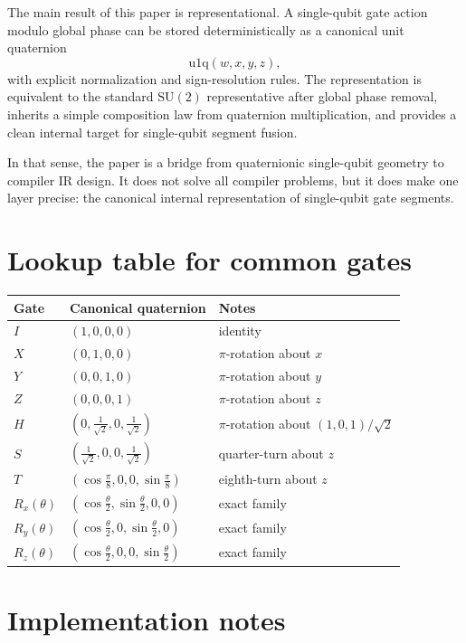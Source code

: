 \documentclass[11pt]{article}
\theoremstyle{remark}
\newcommand{\SU}{\mathrm{SU}}
\newcommand{\Id}{I}
\newcommand{\uoneq}{\mathrm{u1q}}
\begin{document}
The main result of this paper is representational. A single-qubit gate action
modulo global phase can be stored deterministically as a canonical unit
quaternion
\[
\uoneq(w,x,y,z),
\]
with explicit normalization and sign-resolution rules. The representation is
equivalent to the standard $\SU(2)$ representative after global phase removal,
inherits a simple composition law from quaternion multiplication, and provides a
clean internal target for single-qubit segment fusion.

In that sense, the paper is a bridge from quaternionic single-qubit geometry to
compiler IR design. It does not solve all compiler problems, but it does make
one layer precise: the canonical internal representation of single-qubit gate
segments.

\appendix

\section{Lookup table for common gates}

\begin{center}
\begin{tabular}{@{}lll@{}}
\toprule
Gate & Canonical quaternion & Notes \\
\midrule
$\Id$ & $(1,0,0,0)$ & identity \\
$X$ & $(0,1,0,0)$ & $\pi$-rotation about $x$ \\
$Y$ & $(0,0,1,0)$ & $\pi$-rotation about $y$ \\
$Z$ & $(0,0,0,1)$ & $\pi$-rotation about $z$ \\
$H$ & $(0,\tfrac{1}{\sqrt2},0,\tfrac{1}{\sqrt2})$ & $\pi$-rotation about $(1,0,1)/\sqrt2$ \\
$S$ & $(\tfrac{1}{\sqrt2},0,0,\tfrac{1}{\sqrt2})$ & quarter-turn about $z$ \\
$T$ & $(\cos\tfrac{\pi}{8},0,0,\sin\tfrac{\pi}{8})$ & eighth-turn about $z$ \\
$R_x(\theta)$ & $(\cos\tfrac{\theta}{2},\sin\tfrac{\theta}{2},0,0)$ & exact family \\
$R_y(\theta)$ & $(\cos\tfrac{\theta}{2},0,\sin\tfrac{\theta}{2},0)$ & exact family \\
$R_z(\theta)$ & $(\cos\tfrac{\theta}{2},0,0,\sin\tfrac{\theta}{2})$ & exact family \\
\bottomrule
\end{tabular}
\end{center}

\section{Implementation notes}
\end{document}
